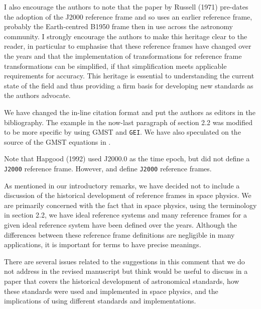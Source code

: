 \documentclass[11pt]{article}
\begin{document}
I also encourage the authors to note that the paper by Russell (1971) pre-dates the adoption of the J2000
reference frame and so uses an earlier reference frame, probably the Earth-centred B1950 frame then in use
across the astronomy community. I strongly encourage the authors to make this heritage clear to the reader,
in particular to emphasise that these reference frames have changed over the years and that the
implementation of transformations for reference frame transformations can be simplified, if that
simplification meets applicable requirements for accuracy. This heritage is essential to understanding the
current state of the field and thus providing a firm basis for developing new standards as the authors
advocate.
\\
{\color{violet}
\begin{leftbar}
We have changed the in-line citation format and put the authors as editors in the bibliography. The example in the now-last paragraph of section 2.2 was modified to be more specific by using GMST and \texttt{GEI}. We have also speculated on the source of the GMST equations in \cite{Russell1971}.

Note that Hapgood (1992) used J2000.0 as the time epoch, but did not define a \texttt{J2000} reference frame. However, \cite{Hapgood1995} and \cite{Franz2002} define \texttt{J2000} reference frames.

As mentioned in our introductory remarks, we have decided not to include a discussion of the historical development of reference frames in space physics. We are primarily concerned with the fact that in space physics, using the terminology in section 2.2, we have ideal reference systems and many reference frames for a given ideal reference system have been defined over the years. Although the differences between these reference frame definitions are negligible in many applications, it is important for terms to have precise meanings. 



\iffalse
There are several issues related to the suggestions in this comment that we do not address in the revised manuscript but think would be useful to discuss in a paper that covers the historical development of astronomical standards, how these standards were used and implemented in space physics, and the implications of using different standards and implementations.


\end{leftbar}}
\end{document}
